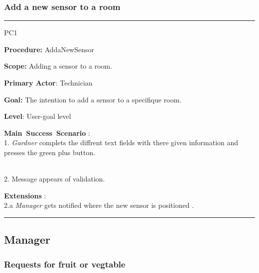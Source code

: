 \subsubsection{Add a new sensor to a room}
\vspace{0.5cm}
\hrule
\hfill \break
\begin{lyxlist}{PC1}
\small{
\item [\textbf{Procedure:}] AddaNewSensor
\item [\textbf{Scope:}] Adding a sensor to a room.
\item [\textbf{Primary Actor}:] Technician
\item [\textbf{Goal:}] The intention to add a sensor to a specifique room.
\item [\textbf{Level}:] User-goal level
\item [\textbf{Main~Success~Scenario}]:\\
1. \emph{Gardner} complets the diffrent text fields with there given
information and presses the green plus button. 
\begin{figure}

\end{figure} \\
2. Message appears of validation.
 \begin{figure}

\end{figure}
\item [\textbf{Extensions}]:\\
2.a  \emph{Manager} gets notified where the new sensor is positioned .\\
}
\end{lyxlist}
\hrule
\vspace{0.5cm}




\subsection{Manager}
\subsubsection{Requests for fruit or vegtable}

